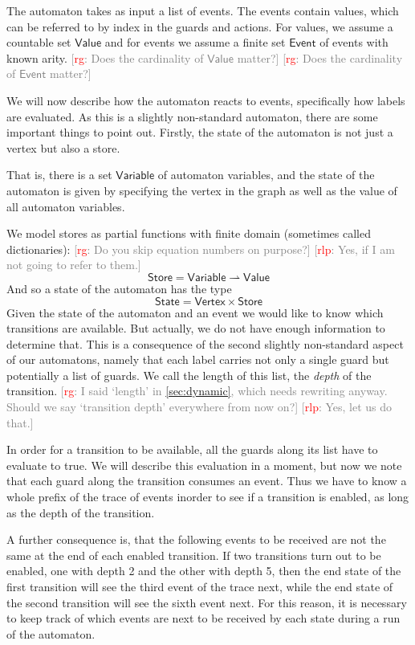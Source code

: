 \documentclass[preprint]{sigplanconf} %
\newcommand{\note}[2]{\textcolor{gray}{[\textcolor{red}{#1}: #2]}}
\newcommand{\rg}[1]{\note{rg}{#1}}
\newcommand{\rlp}[1]{\note{rlp}{#1}}
\newcommand{\pmap}{\rightharpoonup}
\newcommand{\set}[1]{\ensuremath{\mathsf{#1}}}
\theoremstyle{definition}
\theoremstyle{remark}
\begin{document}
The automaton takes as input a list of events. The events contain
values, which can be referred to by index in the guards and actions.
For values, we assume a countable set \set{Value} and for events we assume
a finite set \set{Event} of events with known arity.
\rg{Does the cardinality of \set{Value} matter?}
\rg{Does the cardinality of \set{Event} matter?}

We will now describe how the automaton reacts to events, specifically
how labels are evaluated. As this is a slightly non-standard
automaton, there are some important things to point out. Firstly, the
state of the automaton is not just a vertex but also a store. 

That is, there is a set $\set{Variable}$ of automaton variables, and the state of the automaton is
given by specifying the vertex in the graph as well as the value of
all automaton variables.

We model stores as partial functions with finite domain (sometimes called dictionaries):
\rg{Do you skip equation numbers on purpose?}
\rlp{Yes, if I am not going to refer to them.}
\[
\set{Store} = \set{Variable} \pmap \set{Value}
\]
And so a state of the automaton has the type
\[
\set{State} = \set{Vertex}\times\set{Store}
\]
Given the state of the automaton and an event we would like to know
which transitions are available. But actually, we do not have enough
information to determine that. This is a consequence of the second
slightly non-standard aspect of our automatons, namely that each label
carries not only a single guard but potentially a list of guards.
We call the length of this list, the \emph{depth} of the transition.
\rg{I said `length' in \autoref{sec:dynamic}, which needs rewriting anyway.
Should we say `transition depth' everywhere from now on?}
\rlp{Yes, let us do that.}

In order for a transition to be available, all the guards along its
list have to evaluate to true. We will describe this evaluation in a
moment, but now we note that each guard along the transition consumes
an event. Thus we have to know a whole prefix of the trace of events
inorder to see if a transition is enabled, as long as the depth of the
transition.

A further consequence is, that the following events to be received are
not the same at the end of each enabled transition. If two transitions
turn out to be enabled, one with depth 2 and the other with depth 5,
then the end state of the first transition will see the third event of
the trace next, while the end state of the second transition will see
the sixth event next. For this reason, it is necessary to keep track
of which events are next to be received by each state during a run of
the automaton.
\end{document}
